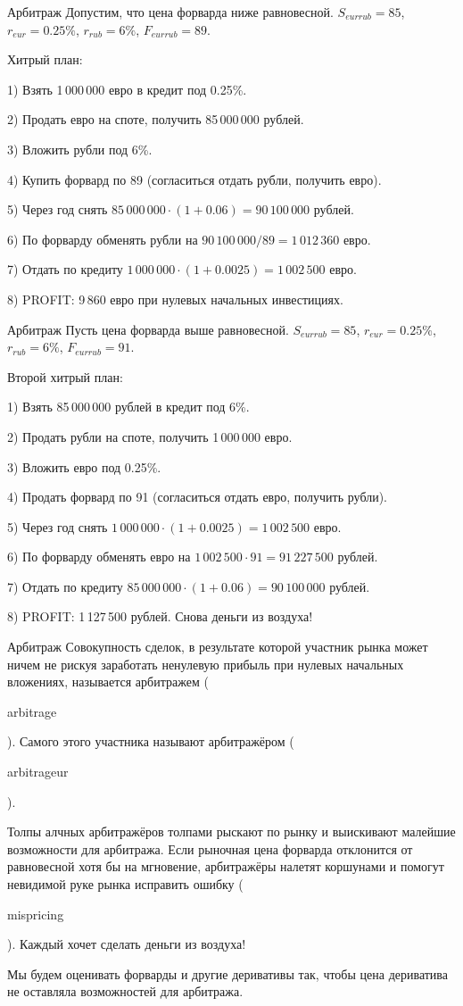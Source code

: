 \documentclass{beamer}
\newcommand{\en}[1]{\begin{otherlanguage}{english}#1\end{otherlanguage}}
\begin{document}
\begin{frame}{Арбитраж}
\justify
Допустим, что цена форварда ниже равновесной. $S_{eurrub}=85$, $r_{eur}=0.25\%$, $r_{rub}=6\%$, $F_{eurrub}=89$. 

\justify
Хитрый план:

1) Взять 1\,000\,000 евро в кредит под 0.25\%.

2) Продать евро на споте, получить 85\,000\,000 рублей.

3) Вложить рубли под 6\%.

4) Купить форвард по 89 (согласиться отдать рубли, получить евро).

5) Через год снять $85\,000\,000 \cdot (1+0.06) = 90\,100\,000$ рублей.

6) По форварду обменять рубли на $90\,100\,000 / 89 = 1\,012\,360$ евро.

7) Отдать по кредиту $1\,000\,000 \cdot (1 + 0.0025) = 1\,002\,500$ евро.

8) PROFIT: 9\,860 евро при нулевых начальных инвестициях.
\end{frame}



\begin{frame}{Арбитраж}
\justify
Пусть цена форварда выше равновесной. $S_{eurrub}=85$, $r_{eur}=0.25\%$, $r_{rub}=6\%$, $F_{eurrub}=91$. 

\justify
Второй хитрый план:

1) Взять 85\,000\,000 рублей в кредит под 6\%.

2) Продать рубли на споте, получить 1\,000\,000 евро.

3) Вложить евро под 0.25\%.

4) Продать форвард по 91 (согласиться отдать евро, получить рубли).

5) Через год снять $1\,000\,000 \cdot (1+0.0025) = 1\,002\,500$ евро.

6) По форварду обменять евро на $1\,002\,500 \cdot 91 = 91\,227\,500$ рублей.

7) Отдать по кредиту $85\,000\,000 \cdot (1 + 0.06) = 90\,100\,000$ рублей.

8) PROFIT: 1\,127\,500 рублей. Снова деньги из воздуха!
\end{frame}



\begin{frame}{Арбитраж}
\justify
Совокупность сделок, в результате которой участник рынка может ничем не рискуя заработать ненулевую прибыль при нулевых начальных вложениях, называется арбитражем (\en{arbitrage}). Самого этого участника называют арбитражёром (\en{arbitrageur}).

\justify
Толпы алчных арбитражёров толпами рыскают по рынку и выискивают малейшие возможности для арбитража. Если рыночная цена форварда отклонится от равновесной хотя бы на мгновение, арбитражёры налетят коршунами и помогут невидимой руке рынка исправить ошибку (\en{mispricing}). Каждый хочет сделать деньги из воздуха! 

\justify
Мы будем оценивать форварды и другие деривативы так, чтобы цена дериватива не оставляла возможностей для арбитража.
\end{frame}
\end{document}
